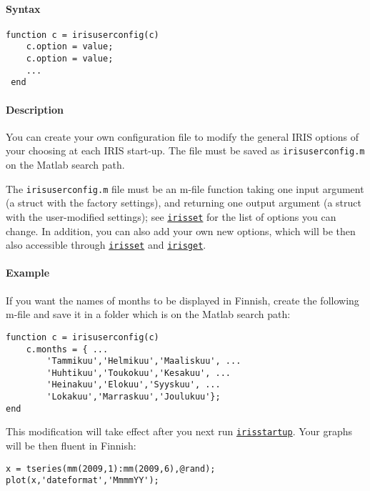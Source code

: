 


	\paragraph{Syntax}\label{syntax}

\begin{verbatim}
function c = irisuserconfig(c)
    c.option = value;
    c.option = value;
    ...
 end
\end{verbatim}

\paragraph{Description}\label{description}

You can create your own configuration file to modify the general IRIS
options of your choosing at each IRIS start-up. The file must be saved
as \texttt{irisuserconfig.m} on the Matlab search path.

The \texttt{irisuserconfig.m} file must be an m-file function taking one
input argument (a struct with the factory settings), and returning one
output argument (a struct with the user-modified settings); see
\href{config/irisset}{\texttt{irisset}} for the list of options you can
change. In addition, you can also add your own new options, which will
be then also accessible through \href{config/irisset}{\texttt{irisset}}
and \href{config/irisget}{\texttt{irisget}}.

\paragraph{Example}\label{example}

If you want the names of months to be displayed in Finnish, create the
following m-file and save it in a folder which is on the Matlab search
path:

\begin{verbatim}
function c = irisuserconfig(c)
    c.months = { ...
        'Tammikuu','Helmikuu','Maaliskuu', ...
        'Huhtikuu','Toukokuu','Kesakuu', ...
        'Heinakuu','Elokuu','Syyskuu', ...
        'Lokakuu','Marraskuu','Joulukuu'};
end
\end{verbatim}

This modification will take effect after you next run
\href{config/irisstartup}{\texttt{irisstartup}}. Your graphs will be
then fluent in Finnish:

\begin{verbatim}
x = tseries(mm(2009,1):mm(2009,6),@rand);
plot(x,'dateformat','MmmmYY');
\end{verbatim}


